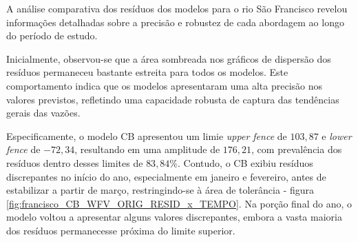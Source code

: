 %
%
%
%

A análise comparativa dos resíduos dos modelos para o rio São Francisco revelou informações detalhadas sobre a precisão e robustez de cada abordagem ao longo do período de estudo.

Inicialmente, observou-se que a área sombreada nos gráficos de dispersão dos resíduos permaneceu bastante estreita para todos os modelos. Este comportamento indica que os modelos apresentaram uma alta precisão nos valores previstos, refletindo uma capacidade robusta de captura das tendências gerais das vazões.

Especificamente, o modelo CB apresentou um limie \textit{upper fence} de $103,87$ e \textit{lower fence} de $-72,34$, resultando em uma amplitude de $176,21$, com prevalência dos resíduos dentro desses limites de $83,84\%$. Contudo, o CB exibiu resíduos discrepantes no início do ano, especialmente em janeiro e fevereiro, antes de estabilizar a partir de março, restringindo-se à área de tolerância - figura \ref{fig:francisco_CB_WFV_ORIG_RESID_x_TEMPO}. Na porção final do ano, o modelo voltou a apresentar alguns valores discrepantes, embora a vasta maioria dos resíduos permanecesse próxima do limite superior.

